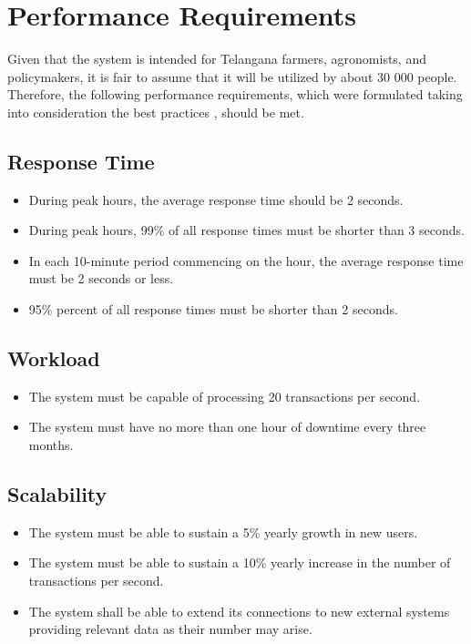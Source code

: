 \section{Performance Requirements} \label{sec:performance_requirements}

Given that the system is intended for Telangana farmers, agronomists, and policymakers, it is fair to assume that it will be utilized by about 30 000 people. Therefore, the following performance requirements, which were formulated taking into consideration the best practices \cite{performance_requirements}, should be met.

\subsection{Response Time}

\begin{itemize}
    \item During peak hours, the average response time should be 2 seconds.
    \item During peak hours, 99\% of all response times must be shorter than 3 seconds.
    \item In each 10-minute period commencing on the hour, the average response time must be 2 seconds or less.
    \item 95\% percent of all response times must be shorter than 2 seconds.
\end{itemize}
 
\subsection{Workload}

\begin{itemize}
    \item The system must be capable of processing 20 transactions per second.
    \item The system must have no more than one hour of downtime every three months.
\end{itemize}

\subsection{Scalability}

\begin{itemize}
    \item The system must be able to sustain a 5\% yearly growth in new users.
    \item The system must be able to sustain a 10\% yearly increase in the number of transactions per second.
    \item The system shall be able to extend its connections to new external systems providing relevant data as their number may arise.
\end{itemize}


